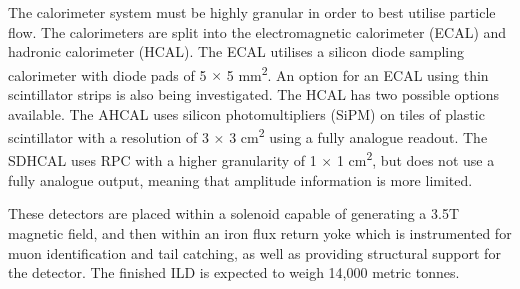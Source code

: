 The calorimeter system must be highly granular in order to best utilise particle flow. The calorimeters are split into the electromagnetic calorimeter (\acrshort{ECAL}) and hadronic calorimeter (\acrshort{HCAL}). The \acrshort{ECAL} utilises a silicon diode sampling calorimeter with diode pads of 5 $\times$ 5 mm\textsuperscript{2}. An option for an ECAL using thin scintillator strips is also being investigated. The \acrshort{HCAL} has two possible options available. The \acrfull{AHCAL} uses silicon photomultipliers (\acrshort{SiPM}) on tiles of plastic scintillator with a resolution of 3 $\times$ 3 cm\textsuperscript{2} using a fully analogue readout. The \acrfull{SDHCAL} uses \acrfull{RPC} with a higher granularity of 1 $\times$ 1 cm\textsuperscript{2}, but does not use a fully analogue output, meaning that amplitude information is more limited. 

These detectors are placed within a solenoid capable of generating a 3.5T magnetic field, and then within an iron flux return yoke which is instrumented for muon identification and tail catching, as well as providing structural support for the detector. The finished ILD is expected to weigh 14,000 metric tonnes.

%

